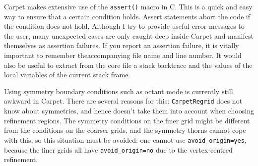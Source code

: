 \documentclass{article}
\begin{document}
   Carpet makes extensive use of the \texttt{assert()} macro in C.
   This is a quick and easy way to ensure that a certain condition
   holds.  Assert statements abort the code if the condition does not
   hold.  Although I try to provide useful error messages to the user,
   many unexpected cases are only caught deep inside Carpet and
   manifest themselves as assertion failures.  If you report an
   assertion failure, it is vitally important to remember
   theaccompanying file name and line number.  It would also be useful
   to extract from the core file a stack backtrace and the values of
   the local variables of the current stack frame.

   Using symmetry boundary conditions such as octant mode is currently
   still awkward in Carpet.  There are several reasons for this:
   \texttt{CarpetRegrid} does not know about symmetries, and hence
   doesn't take them into account when choosing refinement regions.
   The symmetry conditions on the finer grid might be different from
   the conditions on the coarser grids, and the symmetry thorns cannot
   cope with this, so this situation must be avoided: one cannot use
   \texttt{avoid\_origin=yes}, because the finer grids all have
   \texttt{avoid\_origin=no} due to the vertex-centred refinement.
\end{document}
